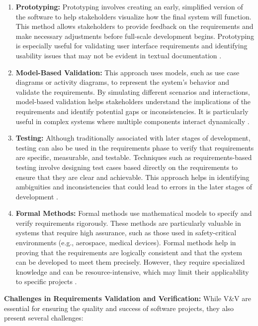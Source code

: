\begin{refsection}
\begin{enumerate}
    \item \textbf{Prototyping:} Prototyping involves creating an early, simplified version of the software to help stakeholders visualize how the final system will function. This method allows stakeholders to provide feedback on the requirements and make necessary adjustments before full-scale development begins. Prototyping is especially useful for validating user interface requirements and identifying usability issues that may not be evident in textual documentation \cite[pp.~180-195]{booch2005unified}.
    
    \item \textbf{Model-Based Validation:} This approach uses models, such as use case diagrams or activity diagrams, to represent the system’s behavior and validate the requirements. By simulating different scenarios and interactions, model-based validation helps stakeholders understand the implications of the requirements and identify potential gaps or inconsistencies. It is particularly useful in complex systems where multiple components interact dynamically \cite[pp.~150-170]{fowler2015uml}.
    
    \item \textbf{Testing:} Although traditionally associated with later stages of development, testing can also be used in the requirements phase to verify that requirements are specific, measurable, and testable. Techniques such as requirements-based testing involve designing test cases based directly on the requirements to ensure that they are clear and achievable. This approach helps in identifying ambiguities and inconsistencies that could lead to errors in the later stages of development \cite[pp.~195-210]{sommerville2016software}.
    
    \item \textbf{Formal Methods:} Formal methods use mathematical models to specify and verify requirements rigorously. These methods are particularly valuable in systems that require high assurance, such as those used in safety-critical environments (e.g., aerospace, medical devices). Formal methods help in proving that the requirements are logically consistent and that the system can be developed to meet them precisely. However, they require specialized knowledge and can be resource-intensive, which may limit their applicability to specific projects \cite[pp.~140-160]{van2010software}.
\end{enumerate}

\textbf{Challenges in Requirements Validation and Verification:} While V\&V are essential for ensuring the quality and success of software projects, they also present several challenges:


\end{refsection}
